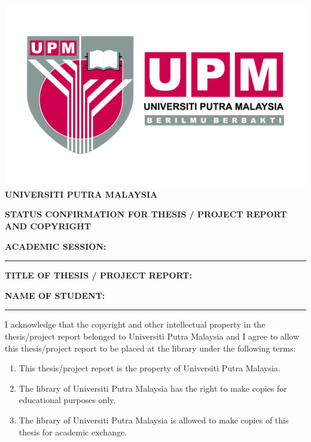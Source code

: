 \thispagestyle{empty}
\setlength{\parskip}{0.5\baselineskip}
\newcommand{\checkbox}{\scalebox{2}{\ding{113}}}
\small

\begin{center}
    \includegraphics[width=0.25\linewidth]{upm-logo.jpg} \\
    \textbf{UNIVERSITI PUTRA MALAYSIA}
    
    \textbf{STATUS CONFIRMATION FOR THESIS / PROJECT REPORT AND COPYRIGHT}
    
    \textbf{ACADEMIC SESSION:} \rule{4cm}{0.4pt}
\end{center}

\textbf{TITLE OF THESIS / PROJECT REPORT:}

\hrulefill

\hrulefill

\hrulefill

\textbf{NAME OF STUDENT: } \rule{10cm}{0.4pt}

I acknowledge that the copyright and other intellectual property in the thesis/project report belonged to Universiti Putra Malaysia and I agree to allow this thesis/project report to be placed at the library under the following terms: \\

\begin{enumerate}[topsep=-0.5cm, leftmargin=*]
    \item This thesis/project report is the property of Universiti Putra Malaysia.
    \item The library of Universiti Putra Malaysia has the right to make copies for educational purposes only.
    \item The library of Universiti Putra Malaysia is allowed to make copies of this thesis for academic exchange. \\
\end{enumerate}

